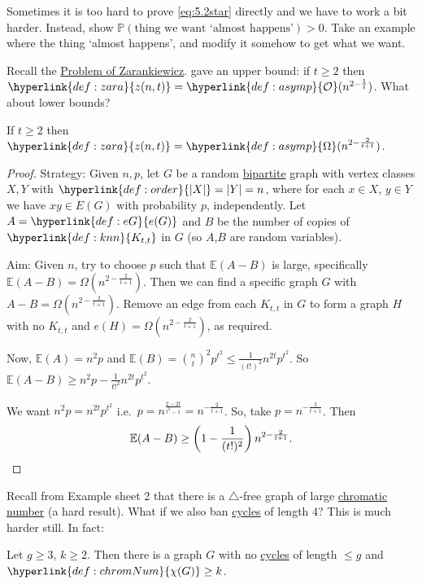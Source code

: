 \documentclass{article}
\begin{document}
Sometimes it is too hard to prove \eqref{eq:5.2star} directly and we have to work a bit harder.
Instead, show $\mathbb{P}(\text{thing we want `almost happens'}) > 0$.
Take an example where the thing `almost happens', and modify it somehow to get what we want.

Recall the \hyperlink{def:zara}{Problem of Zarankiewicz}.
 gave an upper bound: if $t \geq 2$ then $\hyperlink{def:zara}{z(n,t)} = \hyperlink{def:asymp}{\mathcal{O}}(n^{2 - \frac{1}{t}})$. What about lower bounds?
\begin{nthm}\label{thm:38}
    If $t \geq 2$ then $\hyperlink{def:zara}{z(n,t)} = \hyperlink{def:asymp}{\Omega}(n^{2 - \frac{2}{t+1}})$.
\end{nthm}
\begin{proof}
    Strategy: Given $n,p$, let $G$ be a random \hyperlink{def:bipartite}{bipartite} graph with vertex classes $X,Y$ with $\hyperlink{def:order}{|X|}=|Y|=n$, where for each $x \in X$, $y \in Y$ we have $xy \in E(G)$ with probability $p$, independently.
    Let $A = \hyperlink{def:eG}{e(G)}$ and $B$ be the number of copies of $\hyperlink{def:knn}{K_{t,t}}$ in $G$ (so $A$,$B$ are random variables).

    Aim: Given $n$, try to choose $p$ such that $\mathbb{E}(A-B)$ is large, specifically $\mathbb{E}(A-B) = \Omega(n^{2 - \frac{2}{t+1}})$.
    Then we can find a specific graph $G$ with $A-B = \Omega(n^{2-\frac{2}{t+1}})$.
    Remove an edge from each $K_{t,t}$ in $G$ to form a graph $H$ with no $K_{t,t}$ and $e(H) = \Omega(n^{2 - \frac{2}{t+1}})$, as required.

    Now, $\mathbb{E}(A) = n^2 p$ and $\mathbb{E}(B) = \binom{n}{t}^2 p^{t^2} \leq \frac{1}{(t!)^2} n^{2t}p^{t^2}$.
    So $\mathbb{E}(A-B) \geq n^2 p - \frac{1}{t!^2} n^{2t} p^{t^2}$.

    We want $n^2 p = n^{2t} p^{t^2}$ i.e.\ $p = n^{\frac{2-2t}{t^2-1}} = n^{-\frac{2}{t+1}}$.
    So, take $p = n^{-\frac{2}{t+1}}$.
    Then
    \begin{equation*}
        \mathbb{E}(A-B) \geq \left(1 - \frac{1}{(t!)^2}\right) n^{2 - \frac{2}{t+1}}. \qedhere
    \end{equation*}
\end{proof}
Recall from Example sheet 2 that there is a \hyperlink{def:Kn}{$\triangle$}-free graph of large \hyperlink{def:chromNum}{chromatic number} (a hard result).
What if we also ban \hyperlink{def:cycle}{cycles} of length 4? This is much harder still. In fact:
\begin{nthm}\label{thm:39}
    Let $g \geq 3$, $k \geq 2$. Then there is a graph $G$ with no \hyperlink{def:cycle}{cycles} of length $\leq g$ and $\hyperlink{def:chromNum}{\chi(G)} \geq k$.
\end{nthm}
\end{document}
